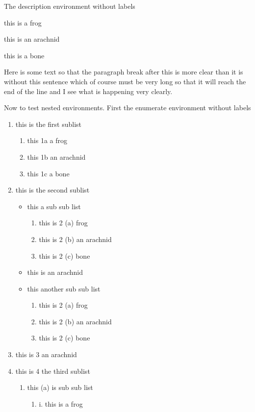 \documentclass{article}
\begin{document}
The description environment without labels
\begin{description}
\item[] this is a frog
\item[] this is an arachnid
\item this is a bone
\end{description}
Here is some text so that the paragraph break after this
is more clear than it is without this sentence which of
course must be very long so that it will reach the end of
the line and I see what is happening very clearly.

Now to test nested environments.  First the enumerate 
environment without labels
\begin{enumerate}
\item this is the first sublist
   \begin{enumerate}
   \item this 1a a frog
   \item this 1b an arachnid
   \item this 1c a bone
   \end{enumerate}
\item this is the second sublist
   \begin{itemize}
   \item this a sub sub list
      \begin{enumerate}
      \item this is 2 (a) frog
      \item this is 2 (b) an arachnid
      \item this is 2 (c) bone
      \end{enumerate}
   \item this is an arachnid
   \item this another sub sub list
      \begin{enumerate}
      \item this is 2 (a) frog
      \item this is 2 (b) an arachnid
      \item this is 2 (c) bone
      \end{enumerate}
   \end{itemize}
\item this is 3 an arachnid
\item this is 4 the third sublist
   \begin{enumerate}
   \item this (a) is sub sub list
      \begin{enumerate}
      \item  i. this is a frog

\end{enumerate}
\end{enumerate}
\end{enumerate}
\end{document}
